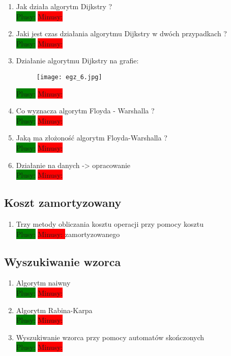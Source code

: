 \documentclass[a4paper,11pt]{article}
\begin{document}
\begin{enumerate}
\item Jak działa algorytm Dijkstry ? \\
\colorbox{green}{Plusy:} \colorbox{red}{Minusy: }

\item Jaki jest czas działania algorytmu Dijkstry w dwóch przypadkach ? \\
\colorbox{green}{Plusy:} \colorbox{red}{Minusy: }

\item Działanie algorytmu Dijkstry na grafie: 
\begin{figure}[H]
\texttt{[image: egz\_6.jpg]}
\end{figure}
\colorbox{green}{Plusy:} \colorbox{red}{Minusy: } 

\item Co wyznacza algorytm Floyda - Warshalla ? \\
\colorbox{green}{Plusy:} \colorbox{red}{Minusy: }

\item Jaką ma złożoność algorytm Floyda-Warshalla ? \\
\colorbox{green}{Plusy:} \colorbox{red}{Minusy: }

\item Działanie na danych -> opracowanie \\
\colorbox{green}{Plusy:} \colorbox{red}{Minusy: }


\end{enumerate}

\subsection{Koszt zamortyzowany}
\begin{enumerate}
\item Trzy metody obliczania kosztu operacji przy pomocy kosztu  \\
\colorbox{green}{Plusy:} \colorbox{red}{Minusy: } zamortyzowanego
\end{enumerate}
\subsection{Wyszukiwanie wzorca}
\begin{enumerate}
\item Algorytm naiwny \\
\colorbox{green}{Plusy:} \colorbox{red}{Minusy: }

\item Algorytm Rabina-Karpa \\
\colorbox{green}{Plusy:} \colorbox{red}{Minusy: }

\item Wyszukiwanie wzorca przy pomocy automatów skończonych \\
\colorbox{green}{Plusy:} \colorbox{red}{Minusy: }
\end{enumerate}
\end{document}
